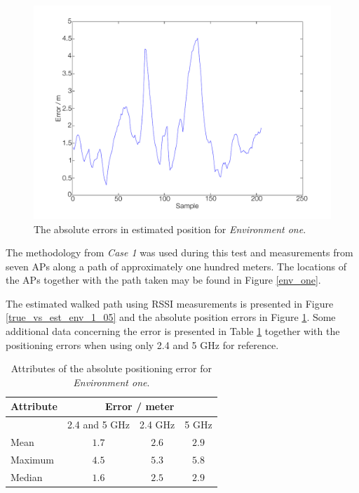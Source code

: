 \documentclass{LTHthesis}
\begin{document}
%
\begin{figure}[!hbt]

\includegraphics[width=1\textwidth ]{images/pure_rssi/error_env_1_05}
\caption{The absolute errors in estimated position for \emph{Environment one}.}\label{error_env_1_05}
\end{figure}
%
The methodology from \emph{Case 1} was used during this test and measurements from seven APs along a path of approximately one hundred meters. The locations of the APs together with the path taken may be found in Figure \ref{env_one}.

The estimated walked path using RSSI measurements is presented in Figure \ref{true_vs_est_env_1_05} and the absolute position errors in Figure \ref{error_env_1_05}. Some additional data concerning the error is presented in Table \ref{table:error_env-1} together with the positioning errors when using only 2.4 and 5 GHz for reference.
%
\begin{table}
\begin{center}
\begin{tabular}{|l|c|c|c|}
\hline
\multicolumn{1}{|c|}{Attribute} & \multicolumn{3}{|c|}{Error / meter} \\
\hline
\multicolumn{1}{c|}{} & 2.4 and 5 GHz & 2.4 GHz & 5 GHz \\
\hline
Mean & $1.7$ & $2.6$ & $2.9$ \\
\hline
Maximum & $4.5$ & $5.3$ & $5.8$\\
\hline
Median & $1.6$ & $2.5$ & $2.9$ \\
\hline 
\end{tabular}
\end{center}
\caption{Attributes of the absolute positioning error for \emph{Environment one}.}\label{table:error_env-1}
\end{table}
\end{document}
